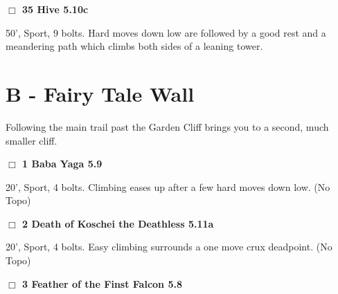 \begin{multicols}{2}
\needspace{2em}
\label{rt:Hive}
\colorbox{RoyalBlue!20}{
\parbox{0.95\linewidth}{
\hspace{-1ex}\textbf{$\Box$
35 Hive 5.10c  
}}}
\begin{adjustwidth}{1.3em}{}			

50', Sport, 9 bolts. Hard moves down low are followed by a good rest and a meandering path which climbs both sides of a leaning tower.
\end{adjustwidth}







\newpage

\section{B - Fairy Tale Wall}\label{sa:Fairy Tale Wall}

Following the main trail past the Garden Cliff brings you to a second, much smaller cliff.\\




\needspace{10em}




\needspace{2em}
\label{rt:Baba Yaga}
\colorbox{green!20}{
\parbox{0.95\linewidth}{
\hspace{-1ex}\textbf{$\Box$
1 Baba Yaga 5.9  
}}}
\begin{adjustwidth}{1.3em}{}			

20', Sport, 4 bolts. Climbing eases up after a few hard moves down low.
  (No Topo)
\end{adjustwidth}




\needspace{2em}
\label{rt:Death of Koschei the Deathless}
\colorbox{RoyalBlue!20}{
\parbox{0.95\linewidth}{
\hspace{-1ex}\textbf{$\Box$
2 Death of Koschei the Deathless 5.11a  
}}}
\begin{adjustwidth}{1.3em}{}			

20', Sport, 4 bolts. Easy climbing surrounds a one move crux deadpoint.
  (No Topo)
\end{adjustwidth}




\needspace{2em}
\label{rt:Feather of the Finst Falcon}
\colorbox{green!20}{
\parbox{0.95\linewidth}{
\hspace{-1ex}\textbf{$\Box$
3 Feather of the Finst Falcon 5.8  
}}}
\begin{adjustwidth}{1.3em}{}			


\end{adjustwidth}
\end{multicols}
